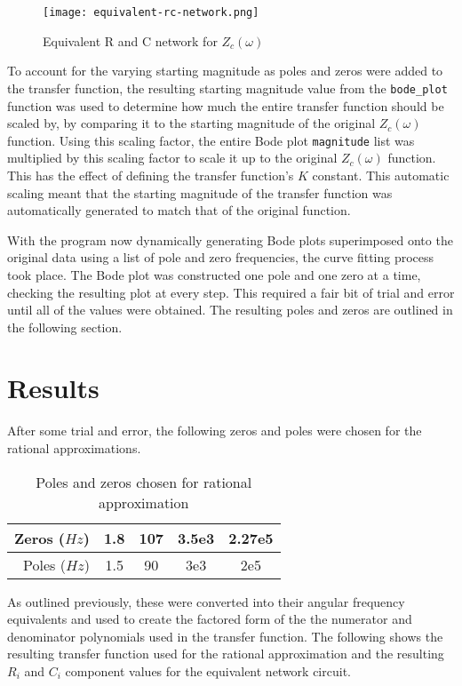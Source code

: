 \documentclass[10pt, oneside, letterpaper]{article}
\begin{document}
\begin{figure}[H]
  \centering
  \texttt{[image: equivalent-rc-network.png]}
  \caption{Equivalent R and C network for $Z_c(\omega{})$}
  \label{zc_rc_network}
\end{figure}

To account for the varying starting magnitude as poles and zeros were added to the transfer function, the resulting starting magnitude value from the \texttt{bode\_plot} function was used to determine how much the entire transfer function should be scaled by, by comparing it to the starting magnitude of the original $Z_c(\omega{})$ function. Using this scaling factor, the entire Bode plot \texttt{magnitude} list was multiplied by this scaling factor to scale it up to the original $Z_c(\omega{})$ function. This has the effect of defining the transfer function's $K$ constant. This automatic scaling meant that the starting magnitude of the transfer function was automatically generated to match that of the original function.

With the program now dynamically generating Bode plots superimposed onto the original data using a list of pole and zero frequencies, the curve fitting process took place. The Bode plot was constructed one pole and one zero at a time, checking the resulting plot at every step. This required a fair bit of trial and error until all of the values were obtained. The resulting poles and zeros are outlined in the following section.

\section{Results}

After some trial and error, the following zeros and poles were chosen for the rational approximations.

\begin{table}[H]
\centering
\begin{tabular}{r|c|c|c|c}
Zeros ($Hz$) & 1.8 & 107 & 3.5e3 & 2.27e5 \\ \hline
Poles ($Hz$) & 1.5 & 90 & 3e3 & 2e5
\end{tabular}
\caption{Poles and zeros chosen for rational approximation}
\label{tab:zero-pole-results}
\end{table}

As outlined previously, these were converted into their angular frequency equivalents and used to create the factored form of the the numerator and denominator polynomials used in the transfer function. The following shows the resulting transfer function used for the rational approximation and the resulting $R_i$ and $C_i$ component values for the equivalent network circuit.
\end{document}
